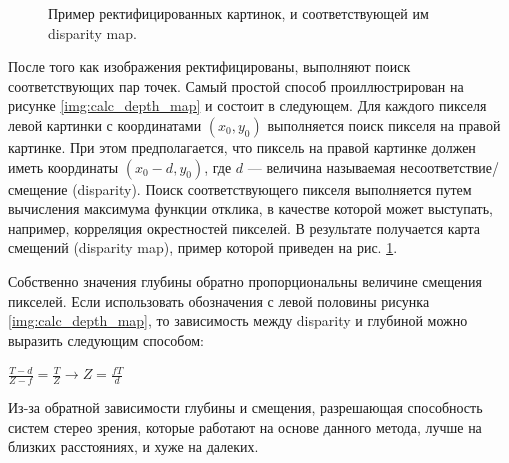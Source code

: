 \begin{figure}[h]
\begin{minipage}[h]{0.3\linewidth}
	\end{minipage}
	\caption{Пример ректифицированных картинок, и соответствующей им disparity map.}
	\label{depth_example1}
\end{figure}

После того как изображения ректифицированы, выполняют поиск соответствующих пар точек. Самый простой способ проиллюстрирован на рисунке \ref{img:calc_depth_map} и состоит в следующем. Для каждого пикселя левой картинки с координатами $(x_0, y_0)$ выполняется поиск пикселя на правой картинке. При этом предполагается, что пиксель на правой картинке должен иметь координаты $(x_0 - d, y_0)$, где $d$ — величина называемая несоответствие/смещение (disparity). Поиск соответствующего пикселя выполняется путем вычисления максимума функции отклика, в качестве которой может выступать, например, корреляция окрестностей пикселей. В результате получается карта смещений (disparity map), пример которой приведен на рис. \ref{depth_example1}.


Собственно значения глубины обратно пропорциональны величине смещения пикселей. Если использовать обозначения с левой половины рисунка \ref{img:calc_depth_map}, то зависимость между disparity и глубиной можно выразить следующим способом:

$\displaystyle \frac{T-d}{Z-f}=\frac{T}{Z} \rightarrow Z=\frac{fT}{d}$

Из-за обратной зависимости глубины и смещения, разрешающая способность систем стерео зрения, которые работают на основе данного метода, лучше на близких расстояниях, и хуже на далеких.